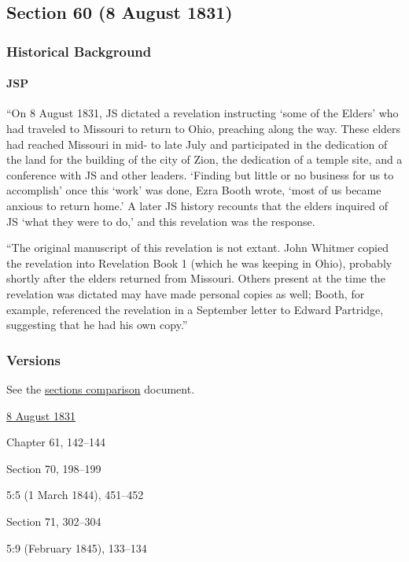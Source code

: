 \subsection{Section 60 (8 August 1831)}
	\label{DC60}
	
	\subsubsection{Historical Background}
		\label{DC60-HB}
		
		\paragraph{JSP}
		
			``On 8 August 1831, JS dictated a revelation instructing `some of the Elders' who had traveled to Missouri to return to Ohio, preaching along the way. These elders had reached Missouri in mid- to late July and participated in the dedication of the land for the building of the city of Zion, the dedication of a temple site, and a conference with JS and other leaders. `Finding but little or no business for us to accomplish' once this `work' was done, Ezra Booth wrote, `most of us became anxious to return home.' A later JS history recounts that the elders inquired of JS `what they were to do,' and this revelation was the response.

			``The original manuscript of this revelation is not extant. John Whitmer copied the revelation into Revelation Book 1 (which he was keeping in Ohio), probably shortly after the elders returned from Missouri. Others present at the time the revelation was dictated may have made personal copies as well; Booth, for example, referenced the revelation in a September letter to Edward Partridge, suggesting that he had his own copy.''
		
	\subsubsection{Versions}
		\label{DC60-V}
		
		See the \href{https://drive.google.com/file/d/1goAvNz8jS4R8slYfMG_db55Ty2z_vmgK/view?usp=sharing}{sections comparison} document.
	
		\begin{compactdesc}
			\item[JSP] \hyperref[EMS-1831-JS-8-AUG-1831]{8 August 1831}
			\item[BC] Chapter 61, 142--144
			\item[DC 1835] Section 70, 198--199
			\item[TS] 5:5 (1 March 1844), 451--452
			\item[DC 1844] Section 71, 302--304
			\item[MS] 5:9 (February 1845), 133--134
		\end{compactdesc}

